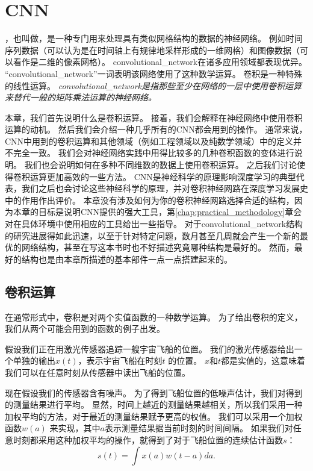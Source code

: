 \chapter{\gls{CNN}}
\label{chap:convolutional_networks}

\citep{LeCun89a}，也叫做，是一种专门用来处理具有类似网格结构的数据的神经网络。
例如时间序列数据（可以认为是在时间轴上有规律地采样形成的一维网格）和图像数据（可以看作是二维的像素网格）。
\gls{convolutional_network}在诸多应用领域都表现优异。
``\gls{convolutional_network}''一词表明该网络使用了这种数学运算。
卷积是一种特殊的线性运算。
\emph{\gls{convolutional_network}是指那些至少在网络的一层中使用卷积运算来替代一般的矩阵乘法运算的神经网络。}

本章，我们首先说明什么是卷积运算。
接着，我们会解释在神经网络中使用卷积运算的动机。
然后我们会介绍一种几乎所有的\gls{CNN}都会用到的操作。
通常来说，\gls{CNN}中用到的卷积运算和其他领域（例如工程领域以及纯数学领域）中的定义并不完全一致。
我们会对神经网络实践中用得比较多的几种卷积函数的变体进行说明。
我们也会说明如何在多种不同维数的数据上使用卷积运算。
之后我们讨论使得卷积运算更加高效的一些方法。
\gls{CNN}是神经科学的原理影响深度学习的典型代表，我们之后也会讨论这些神经科学的原理，并对卷积神经网路在深度学习发展史中的作用作出评价。
本章没有涉及如何为你的卷积神经网路选择合适的结构，因为本章的目标是说明\gls{CNN}提供的强大工具，第\ref{chap:practical_methodology}章会对在具体环境中使用相应的工具给出一些指导。
对于\gls{convolutional_network}结构的研究进展得如此迅速，以至于针对特定问题，数月甚至几周就会产生一个新的最优的网络结构，甚至在写这本书时也不好描述究竟哪种结构是最好的。
然而，最好的结构也是由本章所描述的基本部件一点一点搭建起来的。

 
\section{卷积运算}
\label{sec:the_convolution_operation}

在通常形式中，卷积是对两个实值函数的一种数学运算。
为了给出卷积的定义，我们从两个可能会用到的函数的例子出发。

假设我们正在用激光传感器追踪一艘宇宙飞船的位置。
我们的激光传感器给出一个单独的输出$x(t)$，表示宇宙飞船在时刻$t$ 的位置。
$x$和$t$都是实值的，这意味着我们可以在任意时刻从传感器中读出飞船的位置。

现在假设我们的传感器含有噪声。
为了得到飞船位置的低噪声估计，我们对得到的测量结果进行平均。
显然，时间上越近的测量结果越相关，所以我们采用一种加权平均的方法，对于最近的测量结果赋予更高的权值。
我们可以采用一个加权函数$w(a)$ 来实现，其中$a$表示测量结果据当前时刻的时间间隔。
如果我们对任意时刻都采用这种加权平均的操作，就得到了对于飞船位置的连续估计函数$s$：
\begin{equation}
s(t) = \int x(a)w(t-a)da.
\end{equation}

